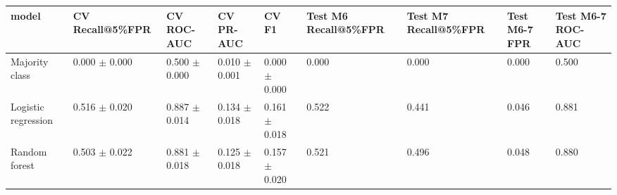 \begin{tabular}{lllllllll}
\toprule
model & CV Recall@5\%FPR & CV ROC-AUC & CV PR-AUC & CV F1 & Test M6 Recall@5\%FPR & Test M7 Recall@5\%FPR & Test M6-7 FPR & Test M6-7 ROC-AUC \\
\midrule
Majority class & 0.000 $\pm$ 0.000 & 0.500 $\pm$ 0.000 & 0.010 $\pm$ 0.001 & 0.000 $\pm$ 0.000 & 0.000 & 0.000 & 0.000 & 0.500 \\
Logistic regression & 0.516 $\pm$ 0.020 & 0.887 $\pm$ 0.014 & 0.134 $\pm$ 0.018 & 0.161 $\pm$ 0.018 & 0.522 & 0.441 & 0.046 & 0.881 \\
Random forest & 0.503 $\pm$ 0.022 & 0.881 $\pm$ 0.018 & 0.125 $\pm$ 0.018 & 0.157 $\pm$ 0.020 & 0.521 & 0.496 & 0.048 & 0.880 \\
\bottomrule
\end{tabular}
